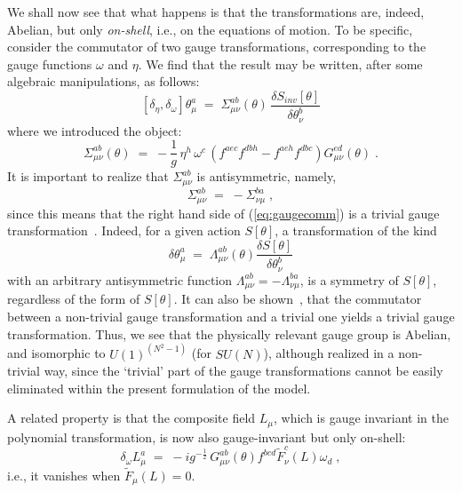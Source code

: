 \documentclass[a4paper,12pt]{article}
\begin{document}
We shall now see that what happens is that the transformations  are, 
indeed, Abelian, but only {\em on-shell}, i.e.,
on the equations of motion. 
To be specific, consider the commutator of two gauge transformations, 
corresponding to the gauge functions $\omega$ and $\eta$.  We find that the 
result may be written, after some algebraic manipulations, as follows:
\begin{equation}\label{eq:gaugecomm}
[\delta_\eta, \delta_\omega ] \theta_\mu^a \;=\; 
\Sigma_{\mu\nu}^{ab} (\theta) \, \frac{\delta S_{inv}[\theta]}{\delta \theta_\nu^b}
\end{equation}
where we introduced the object:
\begin{equation}\label{eq:defsigma}
\Sigma_{\mu\nu}^{ab}(\theta) \;=\; - \frac{1}{g} \,
\eta^h \, \omega^c \, ( f^{aec}   f^{dbh} -   f^{aeh}   f^{dbc})
G_{\mu\nu}^{ed}(\theta) \;. 
\end{equation}
It is important to realize that $\Sigma_{\mu\nu}^{ab}$ is antisymmetric,
namely,
\begin{equation}\label{eq:asymm}
\Sigma_{\mu\nu}^{ab} \;=\; -\Sigma_{\nu\mu}^{ba} \;, 
\end{equation}
since this means that the right hand side of (\ref{eq:gaugecomm}) is a
trivial gauge transformation~\cite{teit}.
Indeed, for a given action $S[\theta]$, a transformation of the kind
\begin{equation}
\delta \theta_\mu^a \;=\; \Lambda_{\mu\nu}^{ab}(\theta) \frac{\delta
S[\theta]}{\delta \theta_\nu^b} 
\end{equation}
with an arbitrary antisymmetric function $\Lambda_{\mu\nu}^{ab}=-
\Lambda_{\nu\mu}^{ba}$, is a symmetry of $S[\theta]$, regardless  of the 
form of $S[\theta]$. It can also be shown~\cite{teit}, that the commutator 
between a non-trivial gauge transformation and a trivial one yields a trivial 
gauge transformation.
Thus, we see that the physically relevant gauge group is Abelian, and
isomorphic to $U(1)^{(N^2 -1)}$ (for $SU(N)$), although realized in a non-trivial 
way, since the `trivial' part of the gauge transformations cannot be
easily eliminated within the present formulation of the model. 

A related property is that the composite field $L_\mu$, which is gauge invariant 
in the polynomial transformation, is now also gauge-invariant but only on-shell:
\begin{equation}\label{eq:delf}
\delta_\omega L_\mu^a \;=\; - i g^{-\frac{1}{2}} \, G_{\mu\nu}^{ab}(\theta) 
f^{bcd} {\tilde F}_\nu^c (L) \omega_d  \;,
\end{equation}
i.e., it vanishes when ${\tilde F}_\mu (L)= 0$.
\end{document}
